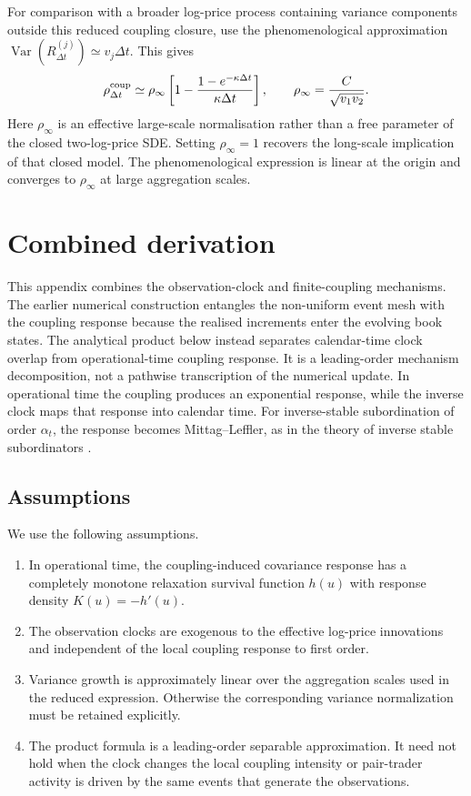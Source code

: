 \documentclass[5p,final]{elsarticle}
\begin{document}
For comparison with a broader log-price process containing variance components outside this reduced coupling closure, use the phenomenological approximation $\operatorname{Var}(R_{\Delta t}^{(j)})\simeq v_j\Delta t$. This gives
\begin{equation}
    \rho_{\Delta t}^{\rm coup}
    \simeq
    \rho_\infty
    \left[1-\frac{1-e^{-\kappa\Delta t}}{\kappa\Delta t}\right],
    \qquad
    \rho_\infty=\frac{C}{\sqrt{v_1v_2}}.
\end{equation}
Here $\rho_\infty$ is an effective large-scale normalisation rather than a free parameter of the closed two-log-price SDE. Setting $\rho_\infty=1$ recovers the long-scale implication of that closed model. The phenomenological expression is linear at the origin and converges to $\rho_\infty$ at large aggregation scales.

\section{Combined derivation}
\label{app:combined-subordination-coupling}

This appendix combines the observation-clock and finite-coupling mechanisms. The earlier numerical construction entangles the non-uniform event mesh with the coupling response because the realised increments enter the evolving book states. The analytical product below instead separates calendar-time clock overlap from operational-time coupling response. It is a leading-order mechanism decomposition, not a pathwise transcription of the numerical update. In operational time the coupling produces an exponential response, while the inverse clock maps that response into calendar time. For inverse-stable subordination of order $\alpha_t$, the response becomes Mittag--Leffler, as in the theory of inverse stable subordinators \citep{MeerschaertStraka2013}.

\subsection{Assumptions}

We use the following assumptions.
\begin{enumerate}
\item[(C1)] In operational time, the coupling-induced covariance response has a completely monotone relaxation survival function $h(u)$ with response density $K(u)=-h'(u)$.
\item[(C2)] The observation clocks are exogenous to the effective log-price innovations and independent of the local coupling response to first order.
\item[(C3)] Variance growth is approximately linear over the aggregation scales used in the reduced expression. Otherwise the corresponding variance normalization must be retained explicitly.
\item[(C4)] The product formula is a leading-order separable approximation. It need not hold when the clock changes the local coupling intensity or pair-trader activity is driven by the same events that generate the observations.
\end{enumerate}
\end{document}
